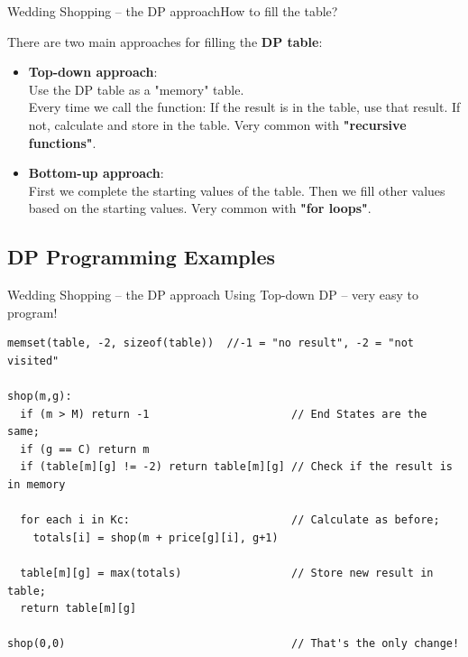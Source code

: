 \begin{frame}{Wedding Shopping -- the DP approach}{How to fill the table?}

  There are two main approaches for filling the {\bf DP table}:
  \bigskip

  \begin{itemize}
  \item {\bf Top-down approach}: \\Use the DP table as a "memory" table.\\
  Every time we call the function: If the result is in the table, use that result. If not, calculate and store in the table. Very common with {\bf "recursive functions"}.
  \vfill

  \item {\bf Bottom-up approach}: \\
  First we complete the starting values of the table. Then we fill other values based on the starting values. Very common with {\bf "for loops"}.
  \end{itemize}
\end{frame}


\subsection{DP Programming Examples}

\begin{frame}[fragile]{Wedding Shopping -- the DP approach}
  {Using Top-down DP -- very easy to program!}

\begin{block}{}
{\smaller
\begin{verbatim}
memset(table, -2, sizeof(table))  //-1 = "no result", -2 = "not visited"

shop(m,g):
  if (m > M) return -1                      // End States are the same;
  if (g == C) return m
  if (table[m][g] != -2) return table[m][g] // Check if the result is in memory

  for each i in Kc:                         // Calculate as before;
    totals[i] = shop(m + price[g][i], g+1)

  table[m][g] = max(totals)                 // Store new result in table;
  return table[m][g]

shop(0,0)                                   // That's the only change!
\end{verbatim}}
\end{block}
\end{frame}

